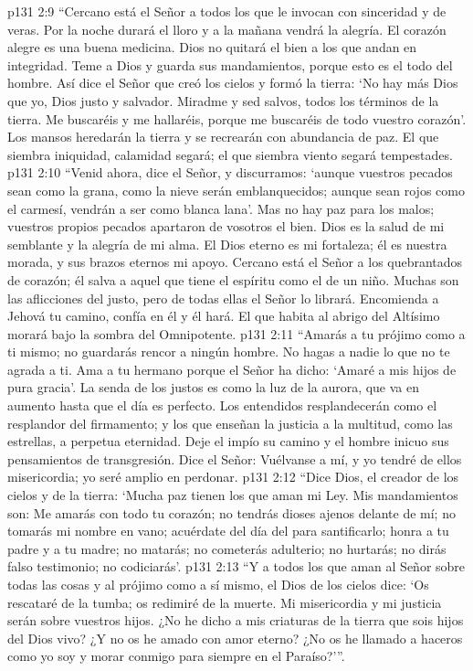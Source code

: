\vs p131 2:9 “Cercano está el Señor a todos los que le invocan con sinceridad y de veras. Por la noche durará el lloro y a la mañana vendrá la alegría. El corazón alegre es una buena medicina. Dios no quitará el bien a los que andan en integridad. Teme a Dios y guarda sus mandamientos, porque esto es el todo del hombre. Así dice el Señor que creó los cielos y formó la tierra: ‘No hay más Dios que yo, Dios justo y salvador. Miradme y sed salvos, todos los términos de la tierra. Me buscaréis y me hallaréis, porque me buscaréis de todo vuestro corazón'. Los mansos heredarán la tierra y se recrearán con abundancia de paz. El que siembra iniquidad, calamidad segará; el que siembra viento segará tempestades.
\vs p131 2:10 “Venid ahora, dice el Señor, y discurramos: ‘aunque vuestros pecados sean como la grana, como la nieve serán emblanquecidos; aunque sean rojos como el carmesí, vendrán a ser como blanca lana’. Mas no hay paz para los malos; vuestros propios pecados apartaron de vosotros el bien. Dios es la salud de mi semblante y la alegría de mi alma. El Dios eterno es mi fortaleza; él es nuestra morada, y sus brazos eternos mi apoyo. Cercano está el Señor a los quebrantados de corazón; él salva a aquel que tiene el espíritu como el de un niño. Muchas son las aflicciones del justo, pero de todas ellas el Señor lo librará. Encomienda a Jehová tu camino, confía en él y él hará. El que habita al abrigo del Altísimo morará bajo la sombra del Omnipotente.
\vs p131 2:11 “Amarás a tu prójimo como a ti mismo; no guardarás rencor a ningún hombre. No hagas a nadie lo que no te agrada a ti. Ama a tu hermano porque el Señor ha dicho: ‘Amaré a mis hijos de pura gracia'. La senda de los justos es como la luz de la aurora, que va en aumento hasta que el día es perfecto. Los entendidos resplandecerán como el resplandor del firmamento; y los que enseñan la justicia a la multitud, como las estrellas, a perpetua eternidad. Deje el impío su camino y el hombre inicuo sus pensamientos de transgresión. Dice el Señor: Vuélvanse a mí, y yo tendré de ellos misericordia; yo seré amplio en perdonar.
\vs p131 2:12 “Dice Dios, el creador de los cielos y de la tierra: ‘Mucha paz tienen los que aman mi Ley. Mis mandamientos son: Me amarás con todo tu corazón; no tendrás dioses ajenos delante de mí; no tomarás mi nombre en vano; acuérdate del día del  para santificarlo; honra a tu padre y a tu madre; no matarás; no cometerás adulterio; no hurtarás; no dirás falso testimonio; no codiciarás'.
\vs p131 2:13 “Y a todos los que aman al Señor sobre todas las cosas y al prójimo como a sí mismo, el Dios de los cielos dice: ‘Os rescataré de la tumba; os redimiré de la muerte. Mi misericordia y mi justicia serán sobre vuestros hijos. ¿No he dicho a mis criaturas de la tierra que sois hijos del Dios vivo? ¿Y no os he amado con amor eterno? ¿No os he llamado a haceros como yo soy y morar conmigo para siempre en el Paraíso?’”.
